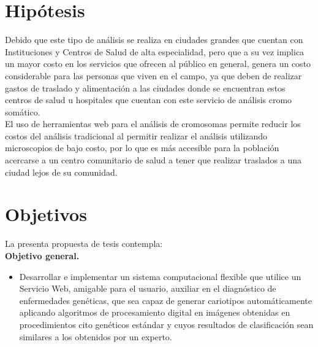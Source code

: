\documentclass[12pt,letterpaper,titlepage]{article}
\begin{document}
\begin{itemize}



\section{Hipótesis}\label{hipotesis}


Debido que este tipo de análisis se realiza en ciudades grandes que cuentan con Instituciones y Centros de Salud de alta especialidad, pero que a su vez implica un mayor costo en los servicios que ofrecen al público en general, genera un costo considerable para las personas que viven en el campo, ya que deben de realizar gastos de traslado y alimentación a las ciudades donde se encuentran estos centros de salud u hospitales que cuentan con este servicio de análisis cromo somático.\\

El uso de herramientas web para el análisis de cromosomas permite reducir los costos del análisis tradicional al permitir realizar el análisis utilizando microscopios de bajo costo, por lo que es más accesible para la población acercarse a un centro comunitario de salud a tener que realizar traslados a una ciudad lejos de su comunidad.\\



\section{Objetivos}\label{objetivos}

La presenta propuesta de tesis contempla:\\

\textbf{Objetivo general.}\\

\begin{itemize}\itemsep=0pt
\item Desarrollar e implementar un sistema computacional flexible que utilice un Servicio Web, amigable para el usuario, auxiliar en el diagnóstico de enfermedades genéticas, que sea capaz de generar cariotipos automáticamente aplicando algoritmos de procesamiento digital en imágenes obtenidas en procedimientos cito genéticos estándar y cuyos resultados de clasificación sean similares a los obtenidos por un experto.\\
\end{itemize}


\end{itemize}
\end{document}
